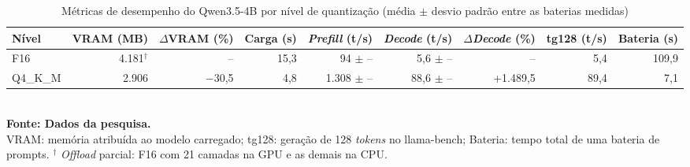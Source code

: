 \begin{table}[htb]
\centering
\caption{Métricas de desempenho do Qwen3.5-4B por nível de quantização (média $\pm$ desvio padrão entre as baterias medidas)}
\label{tab:desempenho-Qwen3.5-4B}
\small
\begin{tabular}{lrrrrrrrr}
\hline
\textbf{Nível} & \textbf{VRAM (MB)} & \textbf{$\Delta$VRAM (\%)} & \textbf{Carga (s)} & \textbf{\textit{Prefill} (t/s)} & \textbf{\textit{Decode} (t/s)} & \textbf{$\Delta$\textit{Decode} (\%)} & \textbf{tg128 (t/s)} & \textbf{Bateria (s)} \\
\hline
F16 & 4.181$^\dagger$ & -- & 15,3 & 94 $\pm$ -- & 5,6 $\pm$ -- & -- & 5,4 & 109,9 \\
Q4\_K\_M & 2.906 & $-$30,5 & 4,8 & 1.308 $\pm$ -- & 88,6 $\pm$ -- & +1.489,5 & 89,4 & 7,1 \\
\hline
\end{tabular}
\\[2pt]{\footnotesize \textbf{Fonte: Dados da pesquisa.}}
\\[2pt]{\footnotesize VRAM: memória atribuída ao modelo carregado; tg128: geração de 128 \textit{tokens} no llama-bench; Bateria: tempo total de uma bateria de prompts. $^\dagger$ \textit{Offload} parcial: F16 com 21 camadas na GPU e as demais na CPU.}
\end{table}
